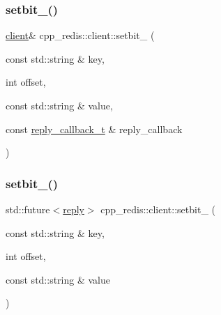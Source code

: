 \mbox{\label{classcpp__redis_1_1client_a17ecd647ae2e9f11e331d1254a21e0d3}} 
\subsubsection{\texorpdfstring{setbit\+\_\+()}{setbit\_()}\hspace{0.1cm}{\footnotesize\ttfamily [1/2]}}
{\footnotesize\ttfamily \hyperlink{classcpp__redis_1_1client}{client}\& cpp\+\_\+redis\+::client\+::setbit\+\_\+ (\begin{DoxyParamCaption}\item[{const std\+::string \&}]{key,  }\item[{int}]{offset,  }\item[{const std\+::string \&}]{value,  }\item[{const \hyperlink{classcpp__redis_1_1client_a061a1140d36d2eaeda82b09a0bb3f9f2}{reply\+\_\+callback\+\_\+t} \&}]{reply\+\_\+callback }\end{DoxyParamCaption})}

\mbox{\label{classcpp__redis_1_1client_abbf3233f6c395c5d4bdf7810c80e6c05}} 
\subsubsection{\texorpdfstring{setbit\+\_\+()}{setbit\_()}\hspace{0.1cm}{\footnotesize\ttfamily [2/2]}}
{\footnotesize\ttfamily std\+::future$<$\hyperlink{classcpp__redis_1_1reply}{reply}$>$ cpp\+\_\+redis\+::client\+::setbit\+\_\+ (\begin{DoxyParamCaption}\item[{const std\+::string \&}]{key,  }\item[{int}]{offset,  }\item[{const std\+::string \&}]{value }\end{DoxyParamCaption})}

\mbox{\label{classcpp__redis_1_1client_a9c82e27a54dc86febda83f34142ea402}} 
